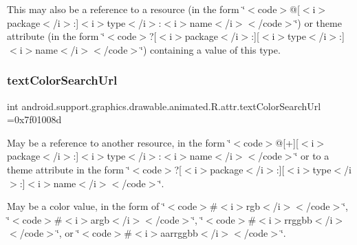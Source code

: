 This may also be a reference to a resource (in the form \char`\"{}$<$code$>$@\mbox{[}$<$i$>$package$<$/i$>$\+:\mbox{]}$<$i$>$type$<$/i$>$\+:$<$i$>$name$<$/i$>$$<$/code$>$\char`\"{}) or theme attribute (in the form \char`\"{}$<$code$>$?\mbox{[}$<$i$>$package$<$/i$>$\+:\mbox{]}\mbox{[}$<$i$>$type$<$/i$>$\+:\mbox{]}$<$i$>$name$<$/i$>$$<$/code$>$\char`\"{}) containing a value of this type. \mbox{\label{classandroid_1_1support_1_1graphics_1_1drawable_1_1animated_1_1R_1_1attr_a61fa39796e71b6cf61f4665329809b1b}} 
\subsubsection{\texorpdfstring{text\+Color\+Search\+Url}{textColorSearchUrl}}
{\footnotesize\ttfamily int android.\+support.\+graphics.\+drawable.\+animated.\+R.\+attr.\+text\+Color\+Search\+Url =0x7f01008d\hspace{0.3cm}{\ttfamily [static]}}

May be a reference to another resource, in the form \char`\"{}$<$code$>$@\mbox{[}+\mbox{]}\mbox{[}$<$i$>$package$<$/i$>$\+:\mbox{]}$<$i$>$type$<$/i$>$\+:$<$i$>$name$<$/i$>$$<$/code$>$\char`\"{} or to a theme attribute in the form \char`\"{}$<$code$>$?\mbox{[}$<$i$>$package$<$/i$>$\+:\mbox{]}\mbox{[}$<$i$>$type$<$/i$>$\+:\mbox{]}$<$i$>$name$<$/i$>$$<$/code$>$\char`\"{}. 

May be a color value, in the form of \char`\"{}$<$code$>$\#$<$i$>$rgb$<$/i$>$$<$/code$>$\char`\"{}, \char`\"{}$<$code$>$\#$<$i$>$argb$<$/i$>$$<$/code$>$\char`\"{}, \char`\"{}$<$code$>$\#$<$i$>$rrggbb$<$/i$>$$<$/code$>$\char`\"{}, or \char`\"{}$<$code$>$\#$<$i$>$aarrggbb$<$/i$>$$<$/code$>$\char`\"{}. \mbox{\label{classandroid_1_1support_1_1graphics_1_1drawable_1_1animated_1_1R_1_1attr_a943b9a7d2bd193e11856412acfff905a}} 

